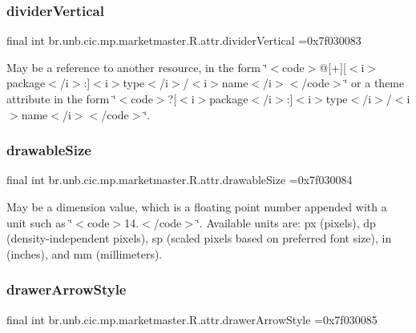\subsubsection{\texorpdfstring{divider\+Vertical}{dividerVertical}}
{\footnotesize\ttfamily final int br.\+unb.\+cic.\+mp.\+marketmaster.\+R.\+attr.\+divider\+Vertical =0x7f030083\hspace{0.3cm}{\ttfamily [static]}}

May be a reference to another resource, in the form \char`\"{}$<$code$>$@\mbox{[}+\mbox{]}\mbox{[}$<$i$>$package$<$/i$>$\+:\mbox{]}$<$i$>$type$<$/i$>$/$<$i$>$name$<$/i$>$$<$/code$>$\char`\"{} or a theme attribute in the form \char`\"{}$<$code$>$?\mbox{[}$<$i$>$package$<$/i$>$\+:\mbox{]}$<$i$>$type$<$/i$>$/$<$i$>$name$<$/i$>$$<$/code$>$\char`\"{}. \mbox{\label{classbr_1_1unb_1_1cic_1_1mp_1_1marketmaster_1_1R_1_1attr_ac2f6c35621216850d77d51c638bd7bd8}} 
\subsubsection{\texorpdfstring{drawable\+Size}{drawableSize}}
{\footnotesize\ttfamily final int br.\+unb.\+cic.\+mp.\+marketmaster.\+R.\+attr.\+drawable\+Size =0x7f030084\hspace{0.3cm}{\ttfamily [static]}}

May be a dimension value, which is a floating point number appended with a unit such as \char`\"{}$<$code$>$14.\+5sp$<$/code$>$\char`\"{}. Available units are\+: px (pixels), dp (density-\/independent pixels), sp (scaled pixels based on preferred font size), in (inches), and mm (millimeters). \mbox{\label{classbr_1_1unb_1_1cic_1_1mp_1_1marketmaster_1_1R_1_1attr_a40fd10dc30acb877960181c271fb575f}} 
\subsubsection{\texorpdfstring{drawer\+Arrow\+Style}{drawerArrowStyle}}
{\footnotesize\ttfamily final int br.\+unb.\+cic.\+mp.\+marketmaster.\+R.\+attr.\+drawer\+Arrow\+Style =0x7f030085\hspace{0.3cm}{\ttfamily [static]}}

